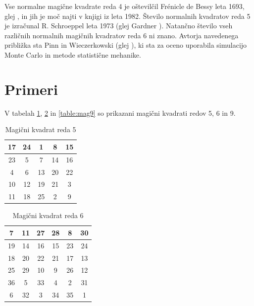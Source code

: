 \documentclass[a4paper,12pt]{article}
\newenvironment{magic}[3]
{
   \begin{table}[!ht]
   \centering
   \caption{#2}
   \label{#3}
   \large
   \begin{tabular}{|*{#1}{c|}}
   \hline
}
{
   \end{tabular}
    \normalsize
\end{table}
}
\theoremstyle{definition}
\theoremstyle{plain}
\begin{document}
Vse normalne magične kvadrate reda 4 je oštevilčil Frénicle de Bessy
leta 1693, glej \cite{bessy}, in jih je moč najti v knjigi \cite{berlekamp}
iz leta 1982. Število normalnih kvadratov reda 5 je izračunal
R. Schroeppel leta 1973 (glej Gardner \cite{gardner}).
Natančno število vseh različnih normalnih magičnih kvadratov reda 6 ni znano.
Avtorja navedenega približka sta Pinn in Wieczerkowski (glej \cite{pinn}), ki
sta za oceno uporabila simulacijo Monte Carlo in metode statistične mehanike.


\section{Primeri}

V tabelah \ref{table:mag5}, \ref{table:mag6} in \ref{table:mag9} so prikazani
magični kvadrati redov 5, 6 in 9. %

\begin{magic}{5}{Magični kvadrat reda 5}{table:mag5}
  17 & 24 &  1 &  8 & 15 \\\hline
  23 &  5 &  7 & 14 & 16 \\\hline
  4 &  6 & 13 & 20 & 22 \\\hline
  10 & 12 & 19 & 21 &  3 \\\hline
  11 & 18 & 25 &  2 &  9 \\\hline
   \end{magic}
\begin{magic}{6}{Magični kvadrat reda 6}{table:mag6}
   7 & 11 & 27 & 28 &  8 & 30 \\\hline
   19 & 14 & 16 & 15 & 23 & 24 \\\hline
   18 & 20 & 22 & 21 & 17 & 13 \\\hline
   25 & 29 & 10 &  9 & 26 & 12 \\\hline
   36 &  5 & 33 &  4 &  2 & 31 \\\hline
   6 & 32 &  3 & 34 & 35 &  1 \\\hline
   \end{magic}
\end{document}
